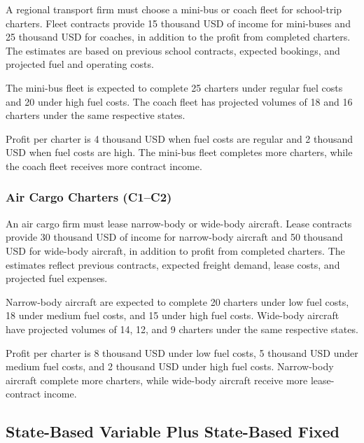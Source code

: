 	A regional transport firm must choose a mini-bus or coach fleet for school-trip charters. Fleet contracts provide 15 thousand USD of income for mini-buses and 25 thousand USD for coaches, in addition to the profit from completed charters. The estimates are based on previous school contracts, expected bookings, and projected fuel and operating costs.
	
	The mini-bus fleet is expected to complete 25 charters under regular fuel costs and 20 under high fuel costs. The coach fleet has projected volumes of 18 and 16 charters under the same respective states.
	
	Profit per charter is 4 thousand USD when fuel costs are regular and 2 thousand USD when fuel costs are high. The mini-bus fleet completes more charters, while the coach fleet receives more contract income.
	
	\subsubsection{Air Cargo Charters (C1--C2)}
	\label{sec:problem21-air-cargo-charters-c1-c2}
	
	An air cargo firm must lease narrow-body or wide-body aircraft. Lease contracts provide 30 thousand USD of income for narrow-body aircraft and 50 thousand USD for wide-body aircraft, in addition to profit from completed charters. The estimates reflect previous contracts, expected freight demand, lease costs, and projected fuel expenses.
	
	Narrow-body aircraft are expected to complete 20 charters under low fuel costs, 18 under medium fuel costs, and 15 under high fuel costs. Wide-body aircraft have projected volumes of 14, 12, and 9 charters under the same respective states.
	
	Profit per charter is 8 thousand USD under low fuel costs, 5 thousand USD under medium fuel costs, and 2 thousand USD under high fuel costs. Narrow-body aircraft complete more charters, while wide-body aircraft receive more lease-contract income.

	
	\subsection{State-Based Variable Plus State-Based Fixed}
	\label{sec:state-based-variable-payoff-plus-state-based-fixed-payoff}



